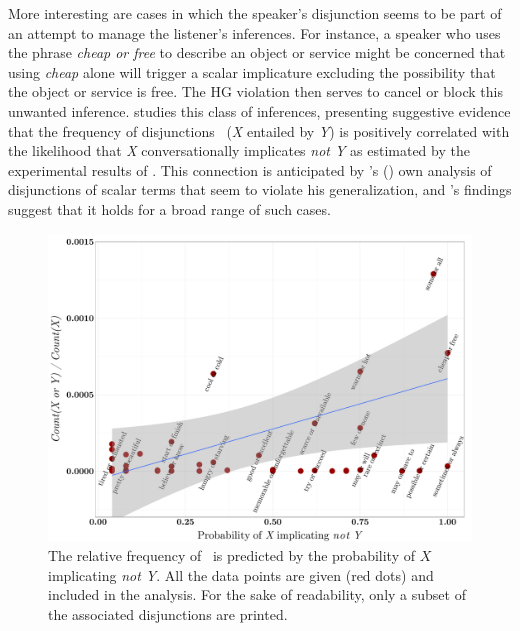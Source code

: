 \documentclass[12pt,twoside]{article}
\newcommand{\posscitet}[1]{\citeauthor{#1}'s (\citeyear{#1})}
\newcommand{\word}[1]{\emph{#1}}
\renewcommand{\_}{\textbf{\textunderscore\hspace{-4pt}\textunderscore\hspace{-3pt}\textunderscore\hspace{-4pt}\textunderscore}\hspace{0.5pt}}			%
\begin{document}
More interesting are cases in which the speaker's disjunction seems to
be part of an attempt to manage the listener's inferences. For
instance, a speaker who uses the phrase \word{cheap or free} to
describe an object or service might be concerned that using \word{cheap} alone
will trigger a scalar implicature \citep{Hirschberg85} excluding the
possibility that the object or service is free. The HG violation then serves to cancel or block this
unwanted inference. \citet{Chemla-HurfordCounts} studies this class of
inferences, presenting suggestive evidence that the frequency of
disjunctions \XorY\ (\word{X} entailed by \word{Y}) is positively
correlated with the likelihood that \word{X} conversationally
implicates \word{not Y} as estimated by the experimental results of
\citet{vanTiel-etal:2013}. This connection is anticipated by
\posscitet{Hurford:1974} own analysis of disjunctions of scalar terms
that seem to violate his generalization, and
\citeauthor{Chemla-HurfordCounts}'s findings suggest that it holds for
a broad range of such cases.

\newcommand{\CountGB}{\emph{Count}}

\begin{figure}[tp]
  \centering
  \includegraphics[width=1\textwidth]{fig/disjunction-and-implicature}
  \caption{The relative frequency of \XorY\ is predicted by the
    probability of $X$ implicating \word{not Y}.  All the data points
    are given (red dots) and included in the analysis. For the sake of
    readability, only a subset of the associated disjunctions are
    printed.}
  \label{fig:chemla}
\end{figure}
\end{document}
